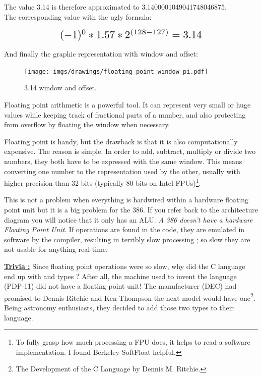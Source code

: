 \documentclass[book.tex]{subfiles}
\begin{document}
The value 3.14 is therefore approximated to 3.1400001049041748046875.\\

The corresponding value with the ugly formula:

\begin{equation*}
\scalebox{1.5}{
$(-1)^0 * 1.57 * 2^{(128-127)} = 3.14$
}
\end{equation*}

\par

And finally the graphic representation with window and offset:\\

\begin{figure}[H]
\centering
\texttt{[image: imgs/drawings/floating\_point\_window\_pi.pdf]}

\caption{3.14 window and offset.}
\label{fig:fp_internals}
\end{figure}
 

Floating point arithmetic is a powerful tool. It can represent very small or huge values while keeping track of fractional parts of a number, and also protecting from overflow by floating the window when necessary.\\
\par
Floating point is handy, but the drawback is that it is also computationally expensive. The reason is simple. In order to add, subtract, multiply or divide two numbers, they both have to be expressed with the same window. This means converting one number to the representation used by the other, usually with higher precision than 32 bits (typically 80 bits on Intel FPUs)\footnote{To fully grasp how much processing a FPU does, it helps to read a software implementation. I found Berkeley SoftFloat helpful.}.\\
\par
This is not a problem when everything is hardwired within a hardware floating point unit but it is a big problem for the 386. If you refer back to the architecture diagram you will notice that it only has an ALU. \emph{A 386 doesn't have a hardware Floating Point Unit}. If  operations are found in the code, they are emulated in software by the compiler, resulting in terribly slow processing ; so slow they are not usable for anything real-time.\\ 
\par


 \textbf{\underline{Trivia :}} Since floating point operations were so slow, why did the C language end up with  and  types ? After all, the machine used to invent the language (PDP-11) did not have a floating point unit! The manufacturer (DEC) had promised to Dennis Ritchie and Ken Thompson the next model would have one\footnote{The Development of the C Language by Dennis M. Ritchie.}. Being astronomy enthusiasts, they decided to add those two types to their language.\\
\par
\end{document}
